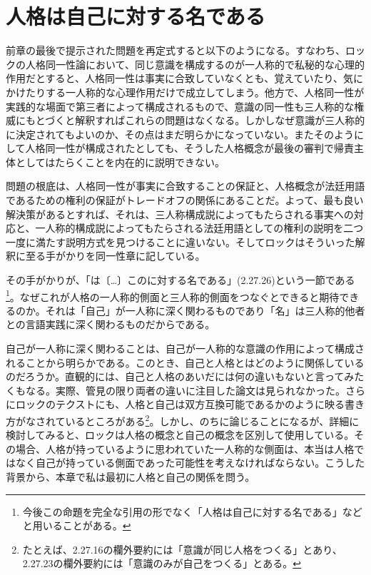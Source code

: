 \documentclass[a4j,oneside]{jsbook}
\begin{document}
\chapter{
人格は自己に対する名である
}
前章の最後で提示された問題を再定式すると以下のようになる。すなわち、ロックの人格同一性論において、同じ意識を構成するのが一人称的で私秘的な心理的作用だとすると、人格同一性は事実に合致していなくとも、覚えていたり、気にかけたりする一人称的な心理作用だけで成立してしまう。他方で、人格同一性が実践的な場面で第三者によって構成されるもので、意識の同一性も三人称的な権威にもとづくと解釈すればこれらの問題はなくなる。しかしなぜ意識が三人称的に決定されてもよいのか、その点はまだ明らかになっていない。またそのようにして人格同一性が構成されたとしても、そうした人格概念が最後の審判で帰責主体としてはたらくことを内在的に説明できない。
\par
問題の根底は、人格同一性が事実に合致することの保証と、人格概念が法廷用語であるための権利の保証がトレードオフの関係にあることだ。よって、最も良い解決策があるとすれば、それは、三人称構成説によってもたらされる事実への対応と、一人称的構成説によってもたらされる法廷用語としての権利の説明を二つ一度に満たす説明方式を見つけることに違いない。そしてロックはそういった解釈に至る手がかりを同一性章に記している。
\par
その手がかりが、「は〔…〕このに対する名である」(2.27.26)という一節である\footnote{今後この命題を完全な引用の形でなく「人格は自己に対する名である」などと用いることがある。}。なぜこれが人格の一人称的側面と三人称的側面をつなぐとできると期待できるのか。それは「自己」が一人称に深く関わるものであり「名」は三人称的他者との言語実践に深く関わるものだからである。
\par
自己が一人称に深く関わることは、自己が一人称的な意識の作用によって構成されることから明らかである。このとき、自己と人格とはどのように関係しているのだろうか。直観的には、自己と人格のあいだには何の違いもないと言ってみたくもなる。実際、管見の限り両者の違いに注目した論文は見られなかった。さらにロックのテクストにも、人格と自己は双方互換可能であるかのように映る書き方がなされているところがある\footnote{たとえば、2.27.16の欄外要約には「意識が同じ人格をつくる」とあり、2.27.23の欄外要約には「意識のみが自己をつくる」とある。}。しかし、のちに論じることになるが、詳細に検討してみると、ロックは人格の概念と自己の概念を区別して使用している。その場合、人格が持っているように思われていた一人称的な側面は、本当は人格ではなく自己が持っている側面であった可能性を考えなければならない。こうした背景から、本章で私は最初に人格と自己の関係を問う。
\par
\end{document}
